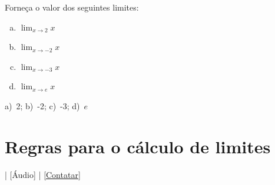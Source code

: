 \begin{exer}
  Forneça o valor dos seguintes limites:
  \begin{enumerate}[a)]
  \item $\displaystyle \lim_{x\to 2} x$
  \item $\displaystyle \lim_{x\to -2} x$
  \item $\displaystyle \lim_{x\to -3} x$
  \item $\displaystyle \lim_{x\to e} x$
  \end{enumerate}
\end{exer}
\begin{resp}
  a)~2; b)~-2; c)~-3; d)~$e$
\end{resp}

\section{Regras para o cálculo de limites}\label{cap_lim_sec_regras}

\begin{flushright}
  [Vídeo] | [Áudio] | \href{https://phkonzen.github.io/notas/contato.html}{[Contatar]}
\end{flushright}

